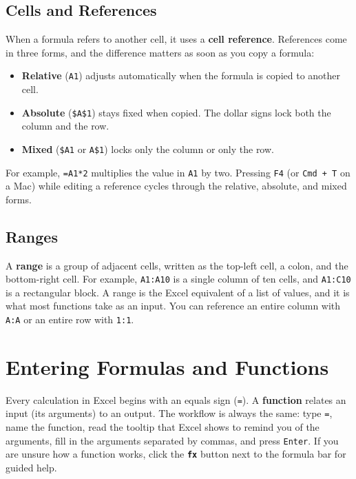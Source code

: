 \documentclass[
  11pt,
  letterpaper,
  DIV=11,
  numbers=noendperiod,
  oneside,
  open=any]{scrreprt}
\providecommand{\tightlist}{%
  \setlength{\itemsep}{0pt}\setlength{\parskip}{0pt}}\usepackage{longtable,booktabs,array}
\begin{document}
\subsection*{Cells and References}\label{cells-and-references}

When a formula refers to another cell, it uses a \textbf{cell
reference}. References come in three forms, and the difference matters
as soon as you copy a formula:

\begin{itemize}
\tightlist
\item
  \textbf{Relative} (\texttt{A1}) adjusts automatically when the formula
  is copied to another cell.
\item
  \textbf{Absolute} (\texttt{\$A\$1}) stays fixed when copied. The
  dollar signs lock both the column and the row.
\item
  \textbf{Mixed} (\texttt{\$A1} or \texttt{A\$1}) locks only the column
  or only the row.
\end{itemize}

For example, \texttt{=A1*2} multiplies the value in \texttt{A1} by two.
Pressing \texttt{F4} (or \texttt{Cmd\ +\ T} on a Mac) while editing a
reference cycles through the relative, absolute, and mixed forms.

\subsection*{Ranges}\label{ranges}

A \textbf{range} is a group of adjacent cells, written as the top-left
cell, a colon, and the bottom-right cell. For example, \texttt{A1:A10}
is a single column of ten cells, and \texttt{A1:C10} is a rectangular
block. A range is the Excel equivalent of a list of values, and it is
what most functions take as an input. You can reference an entire column
with \texttt{A:A} or an entire row with \texttt{1:1}.

\section{Entering Formulas and
Functions}\label{entering-formulas-and-functions}

Every calculation in Excel begins with an equals sign (\texttt{=}). A
\textbf{function} relates an input (its arguments) to an output. The
workflow is always the same: type \texttt{=}, name the function, read
the tooltip that Excel shows to remind you of the arguments, fill in the
arguments separated by commas, and press \texttt{Enter}. If you are
unsure how a function works, click the \textbf{\texttt{fx}} button next
to the formula bar for guided help.
\end{document}
